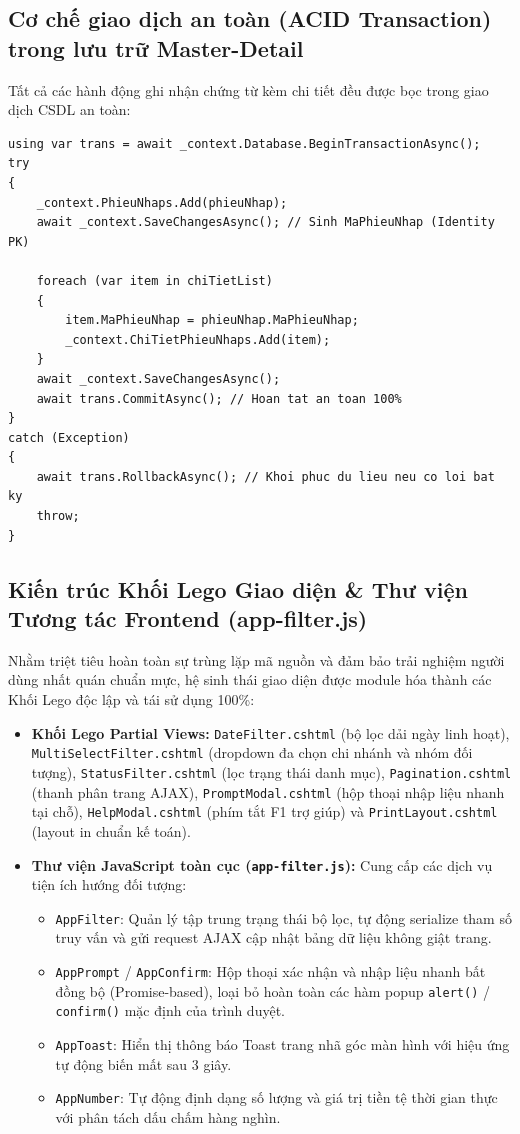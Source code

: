 \documentclass[12pt,a4paper]{report}
\renewcommand{\_}{\textunderscore\allowbreak}
\begin{document}
\subsection{Cơ chế giao dịch an toàn (ACID Transaction) trong lưu trữ Master-Detail}
Tất cả các hành động ghi nhận chứng từ kèm chi tiết đều được bọc trong giao dịch CSDL an toàn:
\begin{lstlisting}[language={[Sharp]C}, caption={Bọc giao dịch ACID khi hoàn thành chứng từ kho}]
using var trans = await _context.Database.BeginTransactionAsync();
try
{
    _context.PhieuNhaps.Add(phieuNhap);
    await _context.SaveChangesAsync(); // Sinh MaPhieuNhap (Identity PK)

    foreach (var item in chiTietList)
    {
        item.MaPhieuNhap = phieuNhap.MaPhieuNhap;
        _context.ChiTietPhieuNhaps.Add(item);
    }
    await _context.SaveChangesAsync();
    await trans.CommitAsync(); // Hoan tat an toan 100%
}
catch (Exception)
{
    await trans.RollbackAsync(); // Khoi phuc du lieu neu co loi bat ky
    throw;
}
\end{lstlisting}

\subsection{Kiến trúc Khối Lego Giao diện \& Thư viện Tương tác Frontend (app-filter.js)}
Nhằm triệt tiêu hoàn toàn sự trùng lặp mã nguồn và đảm bảo trải nghiệm người dùng nhất quán chuẩn mực, hệ sinh thái giao diện được module hóa thành các Khối Lego độc lập và tái sử dụng 100\%:
\begin{itemize}
    \item \textbf{Khối Lego Partial Views:} \texttt{\_DateFilter.cshtml} (bộ lọc dải ngày linh hoạt), \texttt{\_MultiSelectFilter.cshtml} (dropdown đa chọn chi nhánh và nhóm đối tượng), \texttt{\_StatusFilter.cshtml} (lọc trạng thái danh mục), \texttt{\_Pagination.cshtml} (thanh phân trang AJAX), \texttt{\_PromptModal.cshtml} (hộp thoại nhập liệu nhanh tại chỗ), \texttt{\_HelpModal.cshtml} (phím tắt F1 trợ giúp) và \texttt{\_PrintLayout.cshtml} (layout in chuẩn kế toán).
    \item \textbf{Thư viện JavaScript toàn cục (\texttt{app-filter.js}):} Cung cấp các dịch vụ tiện ích hướng đối tượng:
    \begin{itemize}
        \item \texttt{AppFilter}: Quản lý tập trung trạng thái bộ lọc, tự động serialize tham số truy vấn và gửi request AJAX cập nhật bảng dữ liệu không giật trang.
        \item \texttt{AppPrompt} / \texttt{AppConfirm}: Hộp thoại xác nhận và nhập liệu nhanh bất đồng bộ (Promise-based), loại bỏ hoàn toàn các hàm popup \texttt{alert()} / \texttt{confirm()} mặc định của trình duyệt.
        \item \texttt{AppToast}: Hiển thị thông báo Toast trang nhã góc màn hình với hiệu ứng tự động biến mất sau 3 giây.
        \item \texttt{AppNumber}: Tự động định dạng số lượng và giá trị tiền tệ thời gian thực với phân tách dấu chấm hàng nghìn.
    \end{itemize}
\end{itemize}
\end{document}
